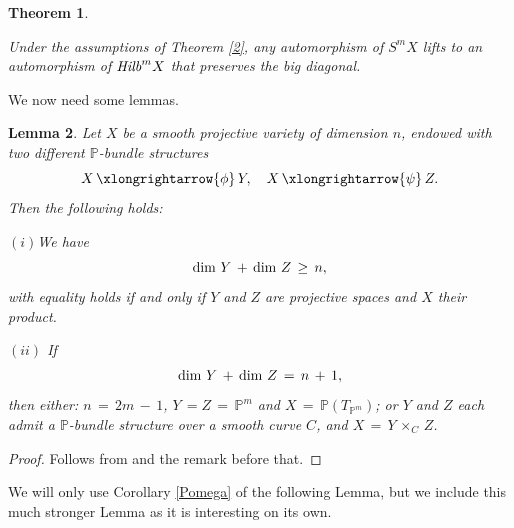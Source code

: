 \documentclass[12pt,reqno]{amsart}
\newtheorem{lemma}{Lemma}[section]
\newtheorem{theorem}[lemma]{Theorem}
\theoremstyle{definition}
\numberwithin{equation}{section}
\begin{document}
\begin{theorem}\label{lift}
    
Under the assumptions of Theorem \ref{2}, any automorphism of $S^{m}X$ lifts to an automorphism of $\emph{Hilb}^{m}X$ that preserves the big diagonal. 
\end{theorem}

We now need some lemmas.

 \begin{lemma}\label{Pbundle}
Let $X$ be a smooth projective variety of dimension $n$, endowed with two different $\mathbb{P}$-bundle structures 
$$ X \,\xlongrightarrow{\phi}\,Y, \quad  X\, \xlongrightarrow{\psi}\, Z.$$ 
Then the following holds:

$(i)$We have 
$$\textnormal{dim}\,\, Y\, +\, \textnormal{dim}\, \, Z \,\geq\, n,$$ 
with equality holds if and only if $Y$ and $Z$ are projective spaces and $X$ their product.

$(ii)$ If
$$ \textnormal{dim}\,\,Y\,+\, \textnormal{dim}\,\,Z\,=\, n\,+\,1, $$
then either:
$n\,=\,2m\,-\,1$, $Y\,=Z\,=\, \mathbb{P}^m$ and $X\,=\,\mathbb{P}(T_{\mathbb{P}^m})$; or $ Y$ and $Z$ each admit a $ \mathbb{P}$-bundle structure over a smooth curve $C$, and $ X\,=\, Y\, \times_{C}\, Z$.
\end{lemma}
\begin{proof}
    Follows from \cite[Theorem 2]{occhetta2002euler} and the remark before that.
\end{proof}


We will only use Corollary \ref{Pomega} of the following Lemma, but we include this much stronger Lemma as it is interesting on its own. 
     
\end{document}
